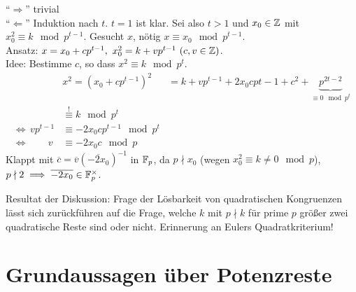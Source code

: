 \documentclass[a4paper,DIV15,BCOR12mm]{article}
\begin{document}
\begin{beweis}
    "`$\Longrightarrow$"' trivial\\
    "`$\Longleftarrow$"' Induktion nach $t$. $t=1$ ist klar. Sei also
    $t>1$ und $x_0 \in \mathbb{Z}$ mit $x_0^2 \equiv k \mod p^{t-1}$.
    Gesucht $x$, nötig $x\equiv x_0 \mod p^{t-1}$.\\
    Ansatz: $x=x_0+cp^{t-1},\ x_0^2=k+vp^{t-1}\ (c,v \in \MdZ)$.\\
    Idee: Bestimme $c$, so dass $x^2\equiv k \mod p^t$.
    \begin{align*}
        &x^2=\left(x_0+cp^{t-1}\right)^2&=k+vp^{t-1}+2x_0cp{t-1}+c^2+\underbrace{p^{2t-2}}_{\equiv 0 \mod p^t}\\
                                       &\stackrel{!}{\equiv} k \mod
                                       p^t\\
        \iff\,  v p^{t-1} &\equiv -2 x_0 c p^{t-1} \mod p^t\\
        \iff \qquad v &\equiv -2x_0c\mod p
    \end{align*}
    Klappt mit $\overline c=\overline v(\overline{-2x_0})^{-1}$ in
    $\mathbb{F}_p$, da $p \nmid x_0$ (wegen $x_0^2\equiv k \neq 0 \mod
    p$), $p \nmid 2 \implies \overline{-2 x_0} \in \mathbb{F}_p^{\times}$.
\end{beweis}
Resultat der Diskussion: Frage der Lösbarkeit von quadratischen
Kongruenzen lässt sich zurückführen auf die Frage, welche $k$ mit
$p\nmid k$ für prime $p$ größer zwei quadratische Reste sind oder
nicht. Erinnerung an Eulers Quadratkriterium!

\section{Grundaussagen über Potenzreste}
\end{document}
